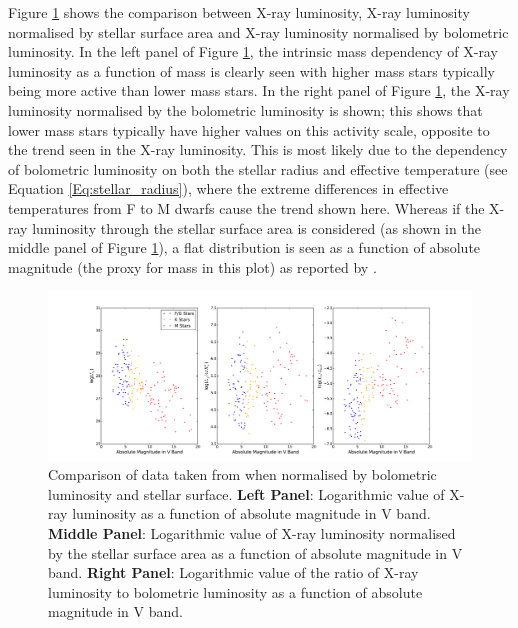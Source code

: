 Figure \ref{fig:Lx_normalise_schmitt_data} shows the comparison between X-ray luminosity, X-ray luminosity normalised by stellar surface area and X-ray luminosity normalised by bolometric luminosity. In the left panel of Figure \ref{fig:Lx_normalise_schmitt_data}, the intrinsic mass dependency of X-ray luminosity as a function of mass is clearly seen with higher mass stars typically being more active than lower mass stars. In the right panel of Figure \ref{fig:Lx_normalise_schmitt_data}, the X-ray luminosity normalised by the bolometric luminosity is shown; this shows that lower mass stars typically have higher values on this activity scale, opposite to the trend seen in the X-ray luminosity. This is most likely due to the dependency of bolometric luminosity on both the stellar radius and effective temperature (see Equation \ref{Eq:stellar_radius}), where the extreme differences in effective temperatures from F to M dwarfs cause the trend shown here. Whereas if the X-ray luminosity through the stellar surface area is considered (as shown in the middle panel of Figure \ref{fig:Lx_normalise_schmitt_data}), a flat distribution is seen as a function of absolute magnitude (the proxy for mass in this plot) as reported by \citet{Schmitt_Liefke_2004}.

\begin{figure}
    \centering
    \includegraphics[scale=0.33]{Figures/3-Xray_age/normalise_schmitt_data.pdf}
    \caption[Comparison of X-ray luminosity and normalised parameters]{Comparison of data taken from \citet{Schmitt_Liefke_2004} when normalised by bolometric luminosity and stellar surface. \textbf{Left Panel}: Logarithmic value of X-ray luminosity as a function of absolute magnitude in V band. \textbf{Middle Panel}: Logarithmic value of X-ray luminosity normalised by the stellar surface area as a function of absolute magnitude in V band. \textbf{Right Panel}: Logarithmic value of the ratio of X-ray luminosity to bolometric luminosity as a function of absolute magnitude in V band.}
    \label{fig:Lx_normalise_schmitt_data}
\end{figure}

